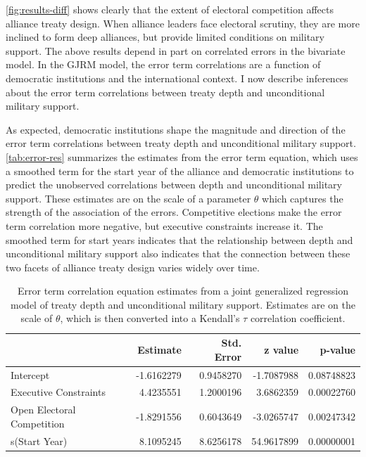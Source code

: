 \documentclass[12pt]{article}
\begin{document}
\autoref{fig:results-diff} shows clearly that the extent of electoral competition affects alliance treaty design.
When alliance leaders face electoral scrutiny, they are more inclined to form deep alliances, but provide limited conditions on military support. 
The above results depend in part on correlated errors in the bivariate model. 
In the GJRM model, the error term correlations are a function of democratic institutions and the international context. 
I now describe inferences about the error term correlations between treaty depth and unconditional military support. 


As expected, democratic institutions shape the magnitude and direction of the error term correlations between treaty depth and unconditional military support. 
\autoref{tab:error-res} summarizes the estimates from the error term equation, which uses a smoothed term for the start year of the alliance and democratic institutions to predict the unobserved correlations between depth and unconditional military support. 
These estimates are on the scale of a parameter $\theta$ which captures the strength of the association of the errors. 
Competitive elections make the error term correlation more negative, but executive constraints increase it. 
The smoothed term for start years indicates that the relationship between depth and unconditional military support also indicates that the connection between these two facets of alliance treaty design varies widely over time. 


\begin{table}[ht]
\centering
\begin{tabular}{lrrrr}
  \hline
 & Estimate & Std. Error & z value & p-value \\ 
  \hline
Intercept & -1.6162279 & 0.9458270 & -1.7087988 & 0.08748823 \\ 
  Executive Constraints & 4.4235551 & 1.2000196 & 3.6862359 & 0.00022760 \\ 
  Open Electoral Competition & -1.8291556 & 0.6043649 & -3.0265747 & 0.00247342 \\ 
  s(Start Year) & 8.1095245 & 8.6256178 & 54.9617899 & 0.00000001 \\ 
   \hline
\end{tabular}
\caption{Error term correlation equation estimates from a joint generalized regression model of treaty depth and unconditional military support. 
                    Estimates are on the scale of $\theta$, which is then converted into a Kendall's $\tau$ correlation coefficient. 
                    } 
\label{tab:error-res}
\end{table}
\end{document}
